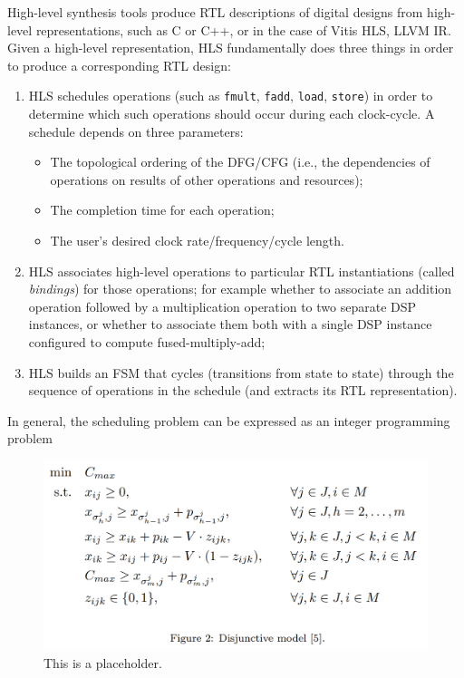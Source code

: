 High-level synthesis tools produce RTL descriptions of digital designs from high-level representations, such as C or C++\cite{10.1145/2514740, ferrandi2021bambu}, or in the case of Vitis HLS, LLVM IR.
Given a high-level representation, HLS fundamentally does three things in order to produce a corresponding RTL design:
\begin{enumerate}
	\item HLS schedules operations (such as \texttt{fmult}, \texttt{fadd}, \texttt{load}, \texttt{store}) in order to determine which such operations should occur during each clock-cycle. A schedule depends on three parameters:
	      \begin{itemize}
		      \item The topological ordering of the DFG/CFG (i.e., the dependencies of operations on results of other operations and resources);
		      \item The completion time for each operation;
		      \item The user's desired clock rate/frequency/cycle length.
	      \end{itemize}
	\item HLS associates high-level operations to particular RTL instantiations (called \emph{bindings}) for those operations; for example whether to associate an addition operation followed by a multiplication operation to two separate DSP instances, or whether to associate them both with a single DSP instance configured to compute fused-multiply-add;
	\item HLS builds an FSM that cycles (transitions from state to state) through the sequence of operations in the schedule (and extracts its RTL representation).
\end{enumerate}
In general, the scheduling problem can be expressed as an integer programming problem\cite{tuprints9272}
\begin{figure}[H]
	\includegraphics[width=\columnwidth]{figures/schedule}
	\caption{This is a placeholder.}
\end{figure}
